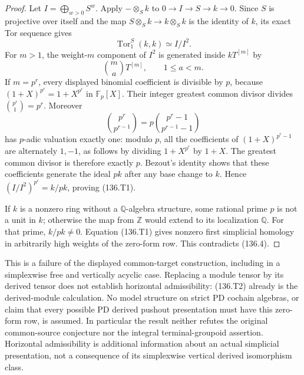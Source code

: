 \documentclass[11pt,a4paper]{article}
\theoremstyle{definition}\newtheorem{definition}[theorem]{Definition}
\theoremstyle{remark}\newtheorem{remark}[theorem]{Remark}
\begin{document}
\begin{proof}
Let $I=\bigoplus_{w>0}S^w$. Apply $-\otimes_S k$ to
$0\to I\to S\to k\to0$. Since $S$ is projective over
itself and the map $S\otimes_S k\to k\otimes_S k$ is
the identity of $k$, its exact Tor sequence gives
\[
                         \operatorname{Tor}_1^S(k,k)
                           \simeq I/I^2.
\]
For $m>1$, the weight-$m$ component of $I^2$ is generated
inside $kT^{[m]}$ by
\[
              \binom ma T^{[m]},\qquad 1\leq a<m.
\]
If $m=p^r$, every displayed binomial coefficient is divisible
by $p$, because $(1+X)^{p^r}=1+X^{p^r}$ in $\mathbb F_p[X]$.
Their integer greatest common divisor divides
$\binom{p^r}{1}=p^r$. Moreover
\[
 \binom{p^r}{p^{r-1}}
   =p\binom{p^r-1}{p^{r-1}-1}
\]
has $p$-adic valuation exactly one: modulo $p$, all the
coefficients of $(1+X)^{p^r-1}$ are alternately $1,-1$,
as follows by dividing $1+X^{p^r}$ by $1+X$.
The greatest common divisor is therefore exactly $p$.
Bezout's identity shows that these coefficients generate
the ideal $pk$ after any base change to $k$. Hence
$(I/I^2)^{p^r}=k/pk$, proving (136.T1).

If $k$ is a nonzero ring without a $\mathbb Q$-algebra
structure, some rational prime $p$ is not a unit in $k$;
otherwise the map from $\mathbb Z$ would extend to its
localization $\mathbb Q$. For that prime, $k/pk\ne0$.
Equation (136.T1) gives nonzero first simplicial homology
in arbitrarily high weights of the zero-form row. This
contradicts (136.4). \qedhere
\end{proof}

This is a failure of the displayed common-target construction,
including in a simplexwise free and vertically acyclic case.
Replacing a module tensor by its derived tensor does not
establish horizontal admissibility: (136.T2) already is the
derived-module calculation. No model structure on strict PD
cochain algebras, or claim that every possible PD derived
pushout presentation must have this zero-form row, is assumed.
In particular the result neither refutes the original
common-source conjecture nor the integral terminal-groupoid
assertion. Horizontal admissibility is additional information
about an actual simplicial presentation, not a consequence
of its simplexwise vertical derived isomorphism class.
\end{document}
